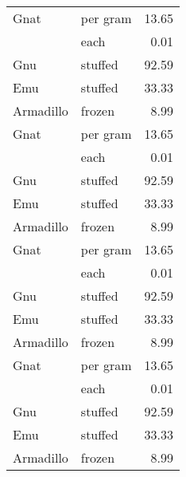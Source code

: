 {
\large
{}

\tablelasttail{}
\begin{center}
\begin{xtabular}{|l|l|r|}
Gnat      & per gram & 13.65 \\
          & each     & 0.01  \\
Gnu       & stuffed  & 92.59 \\
Emu       & stuffed  & 33.33 \\
Armadillo & frozen   & 8.99  \\
Gnat      & per gram & 13.65 \\
          & each     & 0.01  \\
Gnu       & stuffed  & 92.59 \\
Emu       & stuffed  & 33.33 \\
Armadillo & frozen   & 8.99  \\
Gnat      & per gram & 13.65 \\
          & each     & 0.01  \\
Gnu       & stuffed  & 92.59 \\
Emu       & stuffed  & 33.33 \\
Armadillo & frozen   & 8.99  \\
Gnat      & per gram & 13.65 \\
          & each     & 0.01  \\
Gnu       & stuffed  & 92.59 \\
Emu       & stuffed  & 33.33 \\
Armadillo & frozen   & 8.99  \\

\end{xtabular}
\end{center}}
